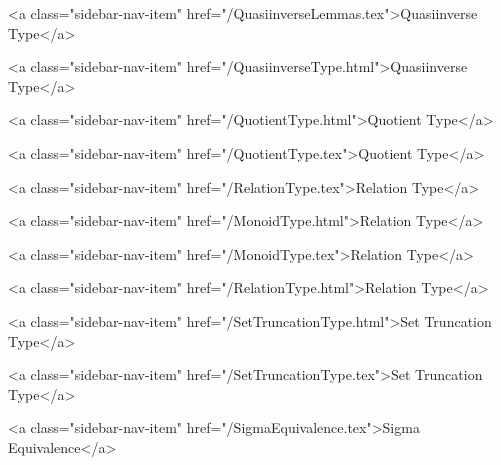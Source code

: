       
    
      
        
          <a class="sidebar-nav-item" href="/QuasiinverseLemmas.tex">Quasiinverse Type</a>
        
      
    
      
        
          <a class="sidebar-nav-item" href="/QuasiinverseType.html">Quasiinverse Type</a>
        
      
    
      
        
          <a class="sidebar-nav-item" href="/QuotientType.html">Quotient Type</a>
        
      
    
      
        
          <a class="sidebar-nav-item" href="/QuotientType.tex">Quotient Type</a>
        
      
    
      
        
          <a class="sidebar-nav-item" href="/RelationType.tex">Relation Type</a>
        
      
    
      
        
          <a class="sidebar-nav-item" href="/MonoidType.html">Relation Type</a>
        
      
    
      
        
          <a class="sidebar-nav-item" href="/MonoidType.tex">Relation Type</a>
        
      
    
      
        
          <a class="sidebar-nav-item" href="/RelationType.html">Relation Type</a>
        
      
    
      
        
          <a class="sidebar-nav-item" href="/SetTruncationType.html">Set Truncation Type</a>
        
      
    
      
        
          <a class="sidebar-nav-item" href="/SetTruncationType.tex">Set Truncation Type</a>
        
      
    
      
        
          <a class="sidebar-nav-item" href="/SigmaEquivalence.tex">Sigma Equivalence</a>
        
